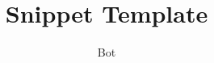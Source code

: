\providecommand{\assubject}{Project Name} %
\providecommand{\asnum}{1} %

\author{Bot}

\title{Snippet Template}

\pagestyle{fancy}
\fancyhead{}\fancyfoot{}
\setlength{\headheight}{52pt} %
\renewcommand{\footrulewidth}{0.4pt}%


